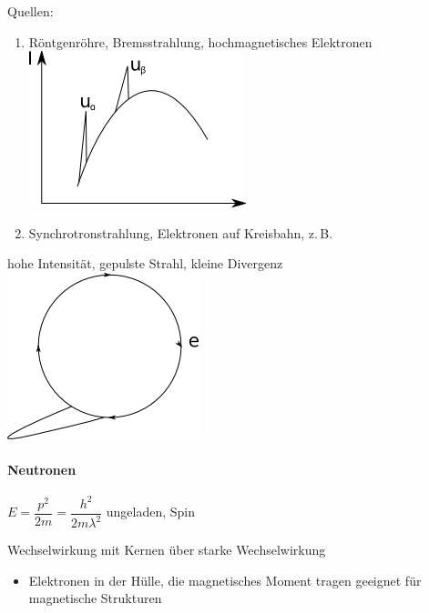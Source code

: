 Quellen:
\begin{enumerate}
\item R\"ontgenr\"ohre, Bremsstrahlung, hochmagnetisches Elektronen\\
\includegraphics[scale=.75]{images/2009-11-05-bremsstrahlung.png}
\item Synchrotronstrahlung, Elektronen auf Kreisbahn, z.\,B.

\end{enumerate}
hohe Intensit\"at, gepulste Strahl, kleine Divergenz\\
\includegraphics[scale=1]{images/2009-11-05-synchrotron.png}


\paragraph{Neutronen}

$E=\dfrac{p^{2}}{2m}=\dfrac{h^{2}}{2m\lambda^{2}}$ ungeladen, Spin

Wechselwirkung mit Kernen \"uber starke Wechselwirkung
\begin{itemize}
\item Elektronen in der H\"ulle, die magnetisches Moment tragen geeignet f\"ur
magnetische Strukturen
\end{itemize}

